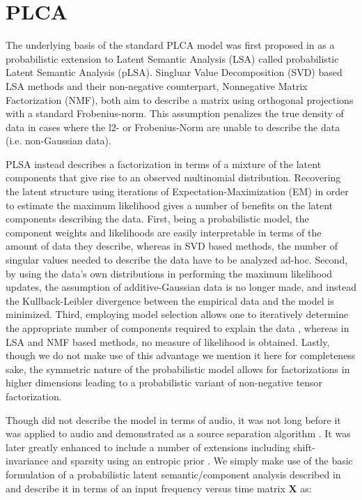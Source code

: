 \documentclass[a4paper,10pt,final]{ThesisStyle}
\begin{document}
\section{PLCA}

The underlying basis of the standard PLCA model was first proposed in \cite{Hofmann1999} as a probabilistic extension to Latent Semantic Analysis (LSA) called probabilistic Latent Semantic Analysis (pLSA).  Singluar Value Decomposition (SVD) based LSA methods and their non-negative counterpart, Nonnegative Matrix Factorization (NMF), both aim to describe a matrix using orthogonal projections with a standard Frobenius-norm.  This assumption penalizes the true density of data in cases where the l2- or Frobenius-Norm are unable to describe the data (i.e. non-Gaussian data).  

PLSA instead describes a factorization in terms of a mixture of the latent components that give rise to an observed multinomial distribution.  Recovering the latent structure using iterations of Expectation-Maximization (EM) in order to estimate the maximum likelihood gives a number of benefits on the latent components describing the data.  First, being a probabilistic model, the component weights and likelihoods are easily interpretable in terms of the amount of data they describe, whereas in SVD based methods, the number of singular values needed to describe the data have to be analyzed ad-hoc.  Second, by using the data's own distributions in performing the maximum likelihood updates, the assumption of additive-Gaussian data is no longer made, and instead the Kullback-Leibler divergence between the empirical data and the model is minimized.  Third, employing model selection allows one to iteratively determine the appropriate number of components required to explain the data \cite{Mital2012b}, whereas in LSA and NMF based methods, no measure of likelihood is obtained.  Lastly, though we do not make use of this advantage we mention it here for completeness sake, the symmetric nature of the probabilistic model allows for factorizations in higher dimensions leading to a probabilistic variant of non-negative tensor factorization.

Though \cite{Hofmann1999,Hofmann2001} did not describe the model in terms of audio, it was not long before it was applied to audio and demonstrated as a source separation algorithm \cite{SmaragdisRajShashanka}.  It was later greatly enhanced to include a number of extensions including shift-invariance and sparsity using an entropic prior \cite{Smaragdis2007}.  We simply make use of the basic formulation of a probabilistic latent semantic/component analysis described in \cite{Hofmann1999,SmaragdisRajShashanka} and describe it in terms of an input frequency versus time matrix $\mathbf{X}$ as:
\end{document}
